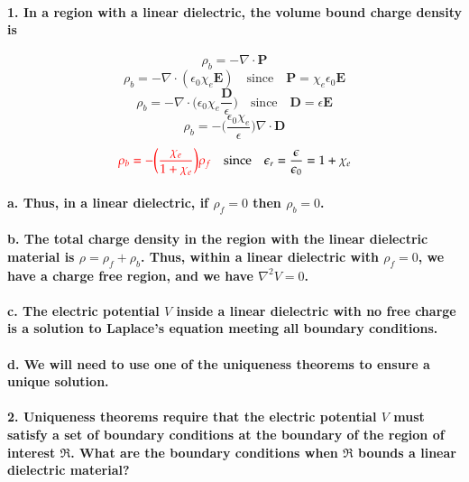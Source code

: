 \documentclass{article}
\begin{document}
\paragraph{1. In a region with a linear dielectric, the volume bound charge density is }
\begin{equation*}
    \rho_b=-\nabla\cdot \boldsymbol{P}
\end{equation*}
\begin{equation*}
    \rho_b=-\nabla\cdot (\epsilon_0\chi_e\boldsymbol{E})\quad \text{since}\quad \boldsymbol{P}=\chi_e\epsilon_0\boldsymbol{E}
\end{equation*}
\begin{equation*}
    \rho_b=-\nabla\cdot\bigg(\epsilon_0\chi_e\frac{\boldsymbol{D}}{\epsilon}\bigg)\quad \text{since}\quad \boldsymbol{D}=\epsilon\boldsymbol{E}
\end{equation*}
\begin{equation*}
    \rho_b=-\bigg(\frac{\epsilon_0\chi_e}{\epsilon}\bigg)\nabla\cdot\boldsymbol{D}
\end{equation*}
\begin{equation*}
    \textcolor{red}{\rho_b=-\bigg(\frac{\chi_e}{1+\chi_e}\bigg)\rho_f}\quad\text{since}\quad \epsilon_r=\frac{\epsilon}{\epsilon_0}=1+\chi_e
\end{equation*}
\paragraph{\indent a. Thus, in a linear dielectric, if $\rho_f=0$ then $\rho_b=0$.}
\paragraph{\indent b. The total charge density in the region with the linear dielectric material is $\rho=\rho_f+\rho_b$. Thus, within a linear dielectric with $\rho_f=0$, we have a charge free region, and we have $\nabla^2V=0$.}
\paragraph{\indent c. The electric potential $V$ inside a linear dielectric with no free charge is a solution to Laplace's equation meeting all boundary conditions.}
\paragraph{\indent d. We will need to use one of the uniqueness theorems to ensure a unique solution.}
\paragraph{2. Uniqueness theorems require that the electric potential $V$ must satisfy a set of boundary conditions at the boundary of the region of interest $\mathfrak{R}$. What are the boundary conditions when $\mathfrak{R}$ bounds a linear dielectric material?}
\end{document}
